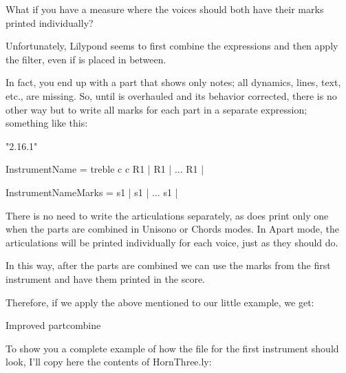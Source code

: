 \documentclass[../../LilyPond-Tutorials]{subfiles}
\begin{document}
\begin{enumerate*}
\item What if you have a measure where the voices should both have their marks printed individually?
\item Unfortunately, Lilypond seems to first combine the expressions and then apply the filter, even if  is placed in between.
\end{enumerate*}

In fact, you end up with a part that shows only notes; all dynamics, lines, text, etc., are missing.
So, until  is overhauled and its behavior corrected, there is no other way but to write all marks for each part in a separate expression; something like this:

\begin{lilypondcode}
\version "2.16.1"


InstrumentName = { %
       \clef treble
       \key c \major
       \relative c {
              \PersonalSettings
              R1 | %
              R1 | %
              ...
              R1 | %
       }
}

InstrumentNameMarks = { %
       s1 | %
       s1 | %
       ...
       s1 | %
}
\end{lilypondcode}

There is no need to write the articulations separately, as  does print only one when the parts are combined in Unisono or Chords modes.
In Apart mode, the articulations will be printed individually for each voice, just as they should do.

In this way, after the parts are combined we can use the marks from the first instrument and have them printed in the score.

Therefore, if we apply the above mentioned to our little example, we get:

\begin{musicExample}
\caption{Improved partcombine}
\label{xmp:partcombine-example-two}
\end{musicExample}

To show you a complete example of how the file for the first instrument should look, I'll copy here the contents of HornThree.ly:
\end{document}
